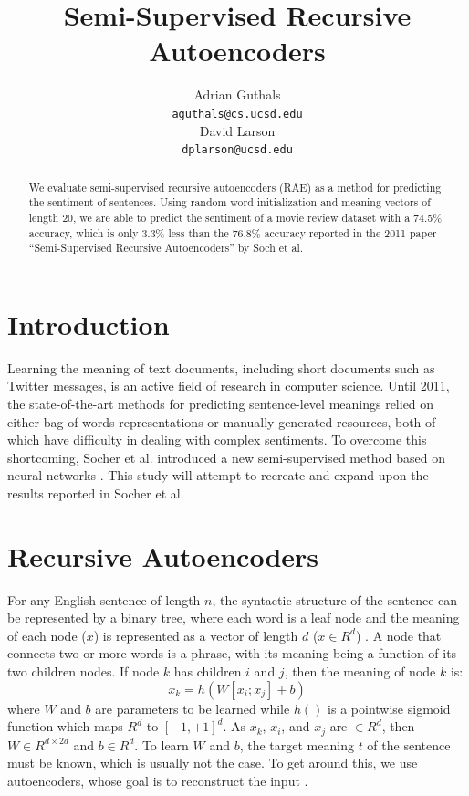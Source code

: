 \documentclass{article}
\title{Semi-Supervised Recursive Autoencoders}
\author{
Adrian Guthals \\
\texttt{aguthals@cs.ucsd.edu} \\
\And
David Larson \\
\texttt{dplarson@ucsd.edu} \\
}
\begin{document}
\maketitle


\begin{abstract}
We evaluate semi-supervised recursive autoencoders (RAE) as a method for predicting the sentiment of sentences. Using random word initialization and meaning vectors of length 20, we are able to predict the sentiment of a movie review dataset with a 74.5\% accuracy, which is only 3.3\% less than the 76.8\% accuracy reported in the 2011 paper ``Semi-Supervised Recursive Autoencoders'' by Soch et al.
\end{abstract}



\section{Introduction}
Learning the meaning of text documents, including short documents such as Twitter messages, is an active field of research in computer science. Until 2011, the state-of-the-art methods for predicting sentence-level meanings relied on either bag-of-words representations or manually generated resources, both of which have difficulty in dealing with complex sentiments. To overcome this shortcoming, Socher et al. introduced a new semi-supervised method based on neural networks \cite{Socher}. This study will attempt to recreate and expand upon the results reported in Socher et al.



\section{Recursive Autoencoders}
For any English sentence of length $n$, the syntactic structure of the sentence can be represented by a binary tree, where each word is a leaf node and the meaning of each node ($x$) is represented as a vector of length $d$ ($x \in R^d$) \cite{CSE250B}. A node that connects two or more words is a phrase, with its meaning being a function of its two children nodes. If node $k$ has children $i$ and $j$, then the meaning of node $k$ is:
\begin{equation}
    x_k = h(W[x_i ; x_j] + b)
    \label{eq:xk}
\end{equation}
where $W$ and $b$ are parameters to be learned while $h()$ is a pointwise sigmoid function which maps $R^d$ to $[-1, +1]^d$. As $x_k$, $x_i$, and $x_j$ are $\in R^d$, then $W \in R^{d \times 2d}$ and $b \in R^d$. To learn $W$ and $b$, the target meaning $t$ of the sentence must be known, which is usually not the case. To get around this, we use autoencoders, whose goal is to reconstruct the input \cite{CSE250B}.
\end{document}
